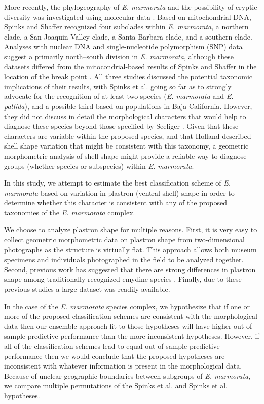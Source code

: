 \documentclass[10pt,letterpaper]{article}
\begin{document}
More recently, the phylogeography of \textit{E. marmorata} and the possibility of cryptic diversity was investigated using molecular data \cite{Spinks2005,Spinks2010,Spinks2014}. Based on mitochondrial DNA, Spinks and Shaffer \cite{Spinks2005} recognized four subclades within \textit{E. marmorata}, a northern clade, a San Joaquin Valley clade, a Santa Barbara clade, and a southern clade. Analyses with nuclear DNA \cite{Spinks2010} and single-nucleotide polymorphism (SNP) data suggest a primarily north--south division in \textit{E. marmorata}, although these datasets differed from the mitocondrial-based results of Spinks and Shaffer \cite{Spinks2005} in the location of the break point \cite{Spinks2014}. All three studies discussed the potential taxonomic implications of their results, with Spinks et al. \cite{Spinks2014} going so far as to strongly advocate for the recognition of at least two species (\emph{E. marmorata} and \emph{E. pallida}), and a possible third based on populations in Baja California. However, they did not discuss in detail the morphological characters that would help to diagnose these species beyond those specified by Seeliger \cite{Seeliger1945}. Given that these characters are variable within the proposed species, and that Holland \cite{Holland1992} described shell shape variation that might be consistent with this taxonomy, a geometric morphometric analysis of shell shape might provide a reliable way to diagnose groups (whether species or subspecies) within \textit{E. marmorata}.

In this study, we attempt to estimate the best classification scheme of \textit{E. marmorata} based on variation in plastron (ventral shell) shape in order to determine whether this character is consistent with any of the proposed taxonomies of the \textit{E. marmorata} complex. 

We choose to analyze plastron shape for multiple reasons. First, it is very easy to collect geometric morphometric data on plastron shape from two-dimensional photographs as the structure is virtually flat. This approach allows both museum specimens and individuals photographed in the field to be analyzed together. Second, previous work has suggested that there are strong differences in plastron shape among traditionally-recognized emydine species \cite{Angielczyk2007,Angielczyk2011,Angielczyk2013a}. Finally, due to these previous studies a large dataset was readily available.

In the case of the \textit{E. marmorata} species complex, we hypothesize that if one or more of the proposed classification schemes are consistent with the morphological data then our ensemble approach fit to those hypotheses will have higher out-of-sample predictive performance than the more inconsistent hypotheses. However, if all of the classification schemes lead to equal out-of-sample predictive performance then we would conclude that the proposed hypotheses are inconsistent with whatever information is present in the morphological data. Because of unclear geographic boundaries between subgroups of \textit{E. marmorata}, we compare multiple permutations of the Spinks et al. \cite{Spinks2010} and Spinks et al. \cite{Spinks2014} hypotheses.
\end{document}
